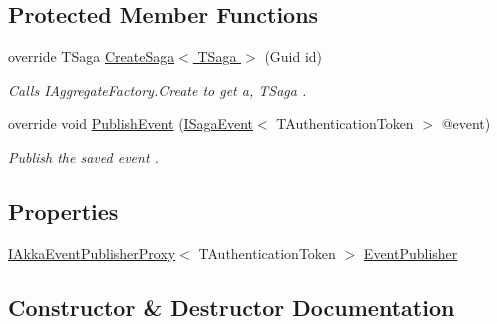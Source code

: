 \subsection*{Protected Member Functions}
\begin{DoxyCompactItemize}
\item 
override T\+Saga \hyperlink{classCqrs_1_1Akka_1_1Domain_1_1AkkaSagaRepository_a2c7263d0e58d2b31149ec685d5be934a_a2c7263d0e58d2b31149ec685d5be934a}{Create\+Saga$<$ T\+Saga $>$} (Guid id)
\begin{DoxyCompactList}\small\item\em Calls I\+Aggregate\+Factory.\+Create to get a, {\itshape T\+Saga} . \end{DoxyCompactList}\item 
override void \hyperlink{classCqrs_1_1Akka_1_1Domain_1_1AkkaSagaRepository_a7f6375bb99e680792466fb420232a535_a7f6375bb99e680792466fb420232a535}{Publish\+Event} (\hyperlink{interfaceCqrs_1_1Events_1_1ISagaEvent}{I\+Saga\+Event}$<$ T\+Authentication\+Token $>$ @event)
\begin{DoxyCompactList}\small\item\em Publish the saved {\itshape event} . \end{DoxyCompactList}\end{DoxyCompactItemize}
\subsection*{Properties}
\begin{DoxyCompactItemize}
\item 
\hyperlink{interfaceCqrs_1_1Akka_1_1Events_1_1IAkkaEventPublisherProxy}{I\+Akka\+Event\+Publisher\+Proxy}$<$ T\+Authentication\+Token $>$ \hyperlink{classCqrs_1_1Akka_1_1Domain_1_1AkkaSagaRepository_a25957859d1f98ea7f434983c562e9724_a25957859d1f98ea7f434983c562e9724}{Event\+Publisher}
\end{DoxyCompactItemize}


\subsection{Constructor \& Destructor Documentation}
\mbox{\label{classCqrs_1_1Akka_1_1Domain_1_1AkkaSagaRepository_a8297f64e2b7a7be7bcc999c89dcece05_a8297f64e2b7a7be7bcc999c89dcece05}} 
